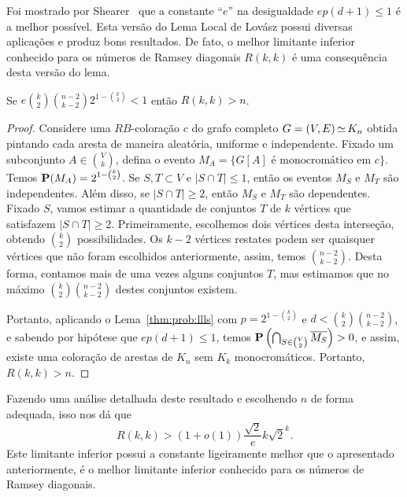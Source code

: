 Foi mostrado por Shearer~\cite{shearer1985problem} que a constante ``$e$'' na desigualdade $ep(d+1) \leq 1$ é a melhor possível. Esta versão do Lema Local de Lovász possui diversas aplicações e produz bons resultados. De fato, o melhor limitante inferior conhecido para os números de Ramsey diagonais $R(k,k)$ é uma consequência desta versão do lema.

\begin{theorem}
\label{thm:prob:ramseylll}
Se $\displaystyle e \binom{k}{2}\binom{n-2}{k-2} 2^{1 - \binom{k}{2}} < 1$ então $R(k,k) > n$.
\end{theorem}
\begin{proof}
Considere uma $RB$-coloração $c$ do grafo completo $G = (V,E) \operatorname{\simeq} K_n$ obtida pintando cada aresta de maneira aleatória, uniforme e independente. Fixado um subconjunto $A \in \binom{V}{k}$, defina o evento $M_A = \{G[A] \text{ é monocromático em } c\}$. Temos $\operatorname{\mathbf{P}}(M_A) = 2^{1- \binom{k}{2}}$. Se $S, T \subset V$ e $|S \cap T| \leq 1$, então os eventos $M_S$ e $M_T$ são independentes.
Além disso, se $|S \cap T| \geq 2$, então $M_S$ e $M_T$ são dependentes. Fixado $S$, vamos estimar a quantidade de conjuntos $T$ de $k$ vértices que satisfazem $|S \cap T| \geq 2$. Primeiramente, escolhemos dois vértices desta interseção, obtendo $\binom{k}{2}$ possibilidades. Os $k-2$ vértices restates podem ser quaisquer vértices que não foram escolhidos anteriormente, assim, temos $\binom{n-2}{k-2}$. Desta forma, contamos mais de uma vezes alguns conjuntos $T$, mas estimamos que no máximo $\binom{k}{2}\binom{n-2}{k-2}$ destes conjuntos existem.

Portanto, aplicando o Lema~\ref{thm:prob:llls} com $p = 2^{1 - \binom{k}{2}}$ e $d < \binom{k}{2}\binom{n-2}{k-2}$, e sabendo por hipótese que $ep(d+1) \leq 1$,
temos $\operatorname{\mathbf{P}} \left( \bigcap_{S \in \binom{V}{2}} \overline{M_S} \right) > 0$, e assim, existe uma coloração de arestas de $K_n$ sem $K_k$ monocromáticos. Portanto, $R(k,k) > n$.
\end{proof}

Fazendo uma análise detalhada deste resultado e escolhendo $n$ de forma adequada, isso nos dá que
\[R(k,k) > (1+o(1))\frac{\sqrt{2}}{e}k\sqrt{2}^k.\]
Este limitante inferior possui a constante ligeiramente melhor que o apresentado anteriormente, é o melhor limitante inferior conhecido para os números de Ramsey diagonais.

